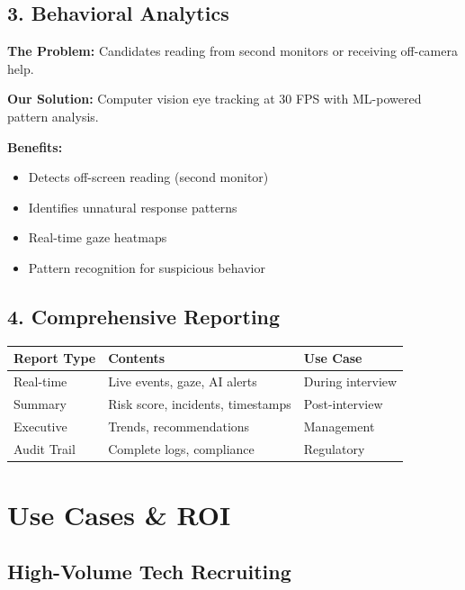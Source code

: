 \documentclass[11pt,letterpaper]{article}
\begin{document}
\subsection{3. Behavioral Analytics}

\textbf{The Problem:} Candidates reading from second monitors or receiving off-camera help.

\textbf{Our Solution:} Computer vision eye tracking at 30 FPS with ML-powered pattern analysis.

\textbf{Benefits:}
\begin{itemize}[noitemsep]
    \item Detects off-screen reading (second monitor)
    \item Identifies unnatural response patterns
    \item Real-time gaze heatmaps
    \item Pattern recognition for suspicious behavior
\end{itemize}

\subsection{4. Comprehensive Reporting}

\begin{table}[H]
\centering
\begin{tabularx}{\textwidth}{lXX}
\toprule
\textbf{Report Type} & \textbf{Contents} & \textbf{Use Case} \\
\midrule
Real-time & Live events, gaze, AI alerts & During interview \\
Summary & Risk score, incidents, timestamps & Post-interview \\
Executive & Trends, recommendations & Management \\
Audit Trail & Complete logs, compliance & Regulatory \\
\bottomrule
\end{tabularx}
\end{table}


\section{Use Cases \& ROI}

\subsection{High-Volume Tech Recruiting}
\end{document}
